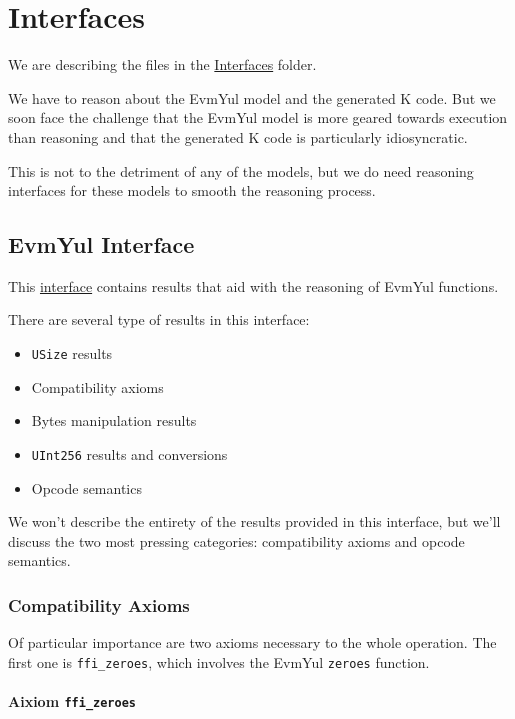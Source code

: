 \chapter{Interfaces}

We are describing the files in the
\href{https://github.com/runtimeverification/evm-equivalence/tree/master/EvmEquivalence/Interfaces}{Interfaces}
folder.

We have to reason about the EvmYul model and the generated K code. But we soon
face the challenge that the EvmYul model is more geared towards execution than
reasoning and that the generated K code is particularly idiosyncratic.

This is not to the detriment of any of the models, but we do need reasoning
interfaces for these models to smooth the reasoning process.

\section{EvmYul Interface}

This
\href{https://github.com/runtimeverification/evm-equivalence/blob/master/EvmEquivalence/Interfaces/EvmYulInterface.lean}{interface}
contains results that aid with the reasoning of EvmYul functions.

There are several type of results in this interface:

\begin{itemize}
\item \texttt{USize} results
\item Compatibility axioms
\item Bytes manipulation results
\item \texttt{UInt256} results and conversions
\item Opcode semantics
\end{itemize}

We won't describe the entirety of the results provided in this interface, but
we'll discuss the two most pressing categories: compatibility axioms and opcode semantics.

\subsection{Compatibility Axioms}

Of particular importance are two axioms necessary to the whole operation. The
first one is \texttt{ffi_zeroes}, which involves the EvmYul \texttt{zeroes} function.

\subsubsection{\textbf{Aixiom \texttt{ffi_zeroes}}}

